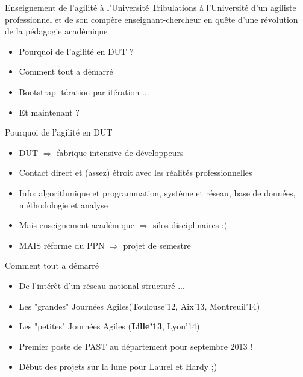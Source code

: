 \documentclass{beamer}
\begin{document}
\begin{frame}{Enseignement de l'agilité à l'Université}
Tribulations à l'Université d'un agiliste professionnel et de son compère enseignant-chercheur en quête d'une révolution de la pédagogie académique
   \begin{itemize}
     \item Pourquoi de l'agilité en DUT ?
     \item Comment tout a démarré
     \item Bootstrap itération par itération ...
     \item Et maintenant ?
   \end{itemize}
\end{frame}

\begin{frame}{Pourquoi de l'agilité en DUT}
   \begin{itemize}
    \item DUT $\Rightarrow$ fabrique intensive de développeurs
    \item Contact direct et (assez) étroit avec les réalités professionnelles
    \item Info: algorithmique et programmation, système et réseau, base de données, méthodologie et analyse
    \item Mais enseignement académique $\Rightarrow$ silos disciplinaires :(
    \item MAIS réforme du PPN  $\Rightarrow$ projet de semestre
   \end{itemize}
\end{frame}

\begin{frame}{Comment tout a démarré}
   \begin{itemize}
     \item De l'intérêt d'un réseau national structuré ...
     \item Les "grandes" Journées Agiles(Toulouse'12, Aix'13, Montreuil'14)
     \item Les "petites" Journées Agiles (\textbf{Lille'13}, Lyon'14)
     \item Premier poste de PAST au département pour septembre 2013 !
     \item Début des projets sur la lune pour Laurel et Hardy ;)
   \end{itemize}
\end{frame}
\end{document}
